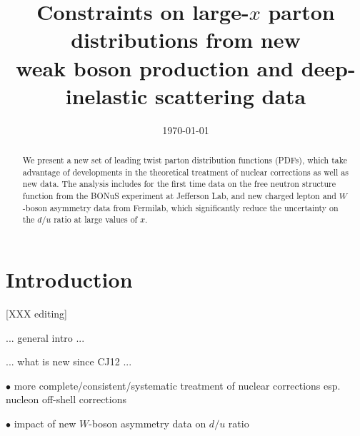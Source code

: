 \documentclass[aps,prd,amsmath,preprint]{revtex4}
\begin{document}
\title{Constraints on large-$x$ parton distributions from new \\
	weak boson production and deep-inelastic scattering data}

%


\date{\today}

\begin{abstract}
We present a new set of leading twist parton distribution functions
(PDFs), which take advantage of developments in the theoretical
treatment of nuclear corrections as well as new data.
The analysis includes for the first time data on the free neutron
structure function from the BONuS experiment at Jefferson Lab,
and new charged lepton and $W$-boson asymmetry data from Fermilab,
which significantly reduce the uncertainty on the $d/u$ ratio at
large values of $x$.
\end{abstract}

\maketitle


\section{Introduction} {\color{red} [XXX editing]}
\label{sec:intro}

... general intro ...

... what is new since CJ12 ...

$\bullet$
more complete/consistent/systematic treatment of nuclear corrections
esp. nucleon off-shell corrections

$\bullet$
impact of new $W$-boson asymmetry data on $d/u$ ratio
\end{document}
